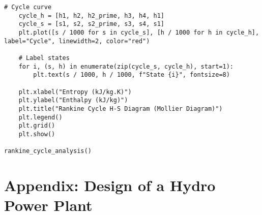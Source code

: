 \documentclass[11pt]{article}
\begin{document}
\begin{lstlisting}[style=custompython, caption=Python code for the Ideal Rankine Cycle]
    # Cycle curve
    cycle_h = [h1, h2, h2_prime, h3, h4, h1]
    cycle_s = [s1, s2, s2_prime, s3, s4, s1]
    plt.plot([s / 1000 for s in cycle_s], [h / 1000 for h in cycle_h], label="Cycle", linewidth=2, color="red")

    # Label states
    for i, (s, h) in enumerate(zip(cycle_s, cycle_h), start=1):
        plt.text(s / 1000, h / 1000, f"State {i}", fontsize=8)

    plt.xlabel("Entropy (kJ/kg.K)")
    plt.ylabel("Enthalpy (kJ/kg)")
    plt.title("Rankine Cycle H-S Diagram (Mollier Diagram)")
    plt.legend()
    plt.grid()
    plt.show()

rankine_cycle_analysis()
\end{lstlisting}
\newpage
\section{Appendix: Design of a Hydro Power Plant}
\end{document}
